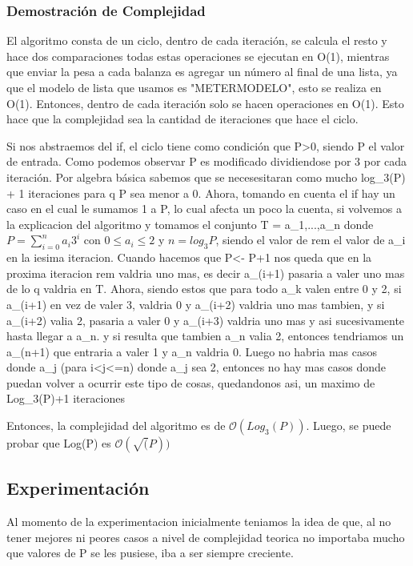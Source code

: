\documentclass[spanish,12pt]{article}
\begin{document}
\subsubsection{Demostración de Complejidad}

El algoritmo consta de un ciclo, dentro de cada iteración, se calcula el resto y hace dos comparaciones todas estas operaciones se ejecutan en O(1), mientras que enviar la pesa a cada balanza
es agregar un número al final de una lista, ya que el modelo de lista que usamos es "METERMODELO", esto se realiza en O(1).
Entonces, dentro de cada iteración solo se hacen operaciones en O(1). Esto hace que la complejidad sea la cantidad de iteraciones que hace el ciclo.

Si nos abstraemos del if, el ciclo tiene como condición que P>0, siendo P el valor de entrada. Como podemos observar P es modificado dividiendose por 3 por cada iteración. Por algebra básica sabemos que se necesesitaran como mucho log_3(P) + 1 iteraciones para q P sea menor a 0.
Ahora, tomando en cuenta el if hay un caso en el cual le sumamos 1 a P, lo cual afecta un poco la cuenta, si volvemos a la explicacion del algoritmo y tomamos el conjunto T = {a_1,...,a_n}
donde  $P = \sum_{i=0}^{n} a_i3^i$  con $0 \leq a_i \leq 2$ y $n = log_{3}{P}$, siendo el valor de rem el valor de a_i en la iesima iteracion.
Cuando hacemos que P<- P+1 nos queda que en la proxima iteracion rem valdria uno mas, es decir a_(i+1) pasaria a valer uno mas de lo q valdria en T. Ahora,  siendo estos que para todo a_k
valen entre 0 y 2, si a_(i+1) en vez de valer 3, valdria 0 y a_(i+2) valdria uno mas tambien, y si  a_(i+2) valia 2, pasaria a valer 0 y  a_(i+3) valdria uno mas y asi sucesivamente hasta llegar a a_n.
y si resulta que tambien a_n valia 2, entonces tendriamos un a_(n+1) que entraria a valer 1 y a_n valdria 0.
Luego no habria mas casos donde a_j (para i<j<=n) donde a_j sea 2, entonces no hay mas casos donde puedan volver a ocurrir este tipo de cosas, quedandonos asi, un maximo de Log_3(P)+1 iteraciones

Entonces, la complejidad del algoritmo es de $\mathcal{O}(Log_{3}(P))$.
Luego, se puede probar que Log(P) es $\mathcal{O}(\sqrt(P))$


\subsection{Experimentación}
 Al momento de la experimentacion inicialmente teniamos la idea de que, al no tener mejores ni peores casos a nivel de complejidad teorica no importaba mucho que valores de P se les pusiese, iba a ser siempre creciente.
\end{document}
